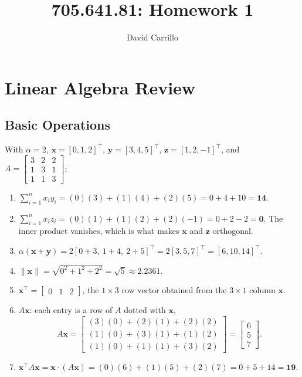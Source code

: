 \documentclass[11pt]{article}
\title{705.641.81: Homework 1}
\author{David Carrillo}
\date{}
\begin{document}
\maketitle

\section{Linear Algebra Review}
\subsection{Basic Operations}

With $\alpha = 2$, $\mathbf{x} = [0,1,2]^\top$, $\mathbf{y} = [3,4,5]^\top$,
$\mathbf{z} = [1,2,-1]^\top$, and
$A = \begin{bmatrix} 3&2&2\\1&3&1\\1&1&3\end{bmatrix}$:

\begin{enumerate}
  \item $\sum_{i=1}^{n} x_i y_i = (0)(3) + (1)(4) + (2)(5) = 0 + 4 + 10 = \mathbf{14}$.

  \item $\sum_{i=1}^{n} x_i z_i = (0)(1) + (1)(2) + (2)(-1) = 0 + 2 - 2 = \mathbf{0}$.
        The inner product vanishes, which is what makes $\mathbf{x}$ and $\mathbf{z}$ orthogonal.

  \item $\alpha(\mathbf{x} + \mathbf{y}) = 2[0+3,\ 1+4,\ 2+5]^\top = 2[3,5,7]^\top = [6,10,14]^\top$.

  \item $\|\mathbf{x}\| = \sqrt{0^2 + 1^2 + 2^2} = \sqrt{5} \approx \mathbf{2.2361}$.

  \item $\mathbf{x}^\top = \begin{bmatrix} 0 & 1 & 2\end{bmatrix}$, the $1 \times 3$ row vector
        obtained from the $3 \times 1$ column $\mathbf{x}$.

  \item $A\mathbf{x}$: each entry is a row of $A$ dotted with $\mathbf{x}$,
        \[
          A\mathbf{x} =
          \begin{bmatrix}
            (3)(0) + (2)(1) + (2)(2)\\
            (1)(0) + (3)(1) + (1)(2)\\
            (1)(0) + (1)(1) + (3)(2)
          \end{bmatrix}
          =
          \begin{bmatrix} 6 \\ 5 \\ 7 \end{bmatrix}.
        \]

  \item $\mathbf{x}^\top A \mathbf{x} = \mathbf{x} \cdot (A\mathbf{x})
        = (0)(6) + (1)(5) + (2)(7) = 0 + 5 + 14 = \mathbf{19}$.
\end{enumerate}
\end{document}
